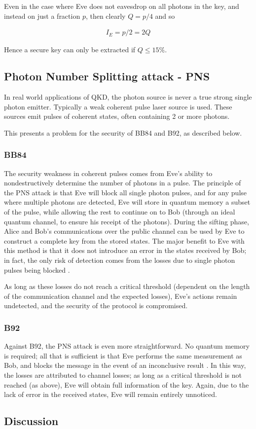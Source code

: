 \documentclass[paper=a4, fontsize=11pt]{scrartcl} %
\numberwithin{equation}{section} %
\numberwithin{figure}{section} %
\numberwithin{table}{section} %
\begin{document}
Even in the case where Eve does not eavesdrop on all photons in the key, and instead on just a fraction $p$,
then clearly $Q = p/4$ and so

\begin{align}
I_E	= p/2 = 2Q
\end{align}

Hence a secure key can only be extracted if $Q \leq 15\%$. \citep{qber15proof}

\subsection{Photon Number Splitting attack - PNS}
In real world applications of QKD, the photon source is never a true strong single photon emitter. Typically
a weak coherent pulse laser source is used. \citep{satellites}
These sources emit pulses of coherent states, often containing 2 or more photons.

This presents a problem for the security of BB84 and B92, as described below.

\subsubsection{BB84}
The security weakness in coherent pulses comes from Eve's ability to nondestructively determine the number of photons
in a pulse. The principle of the PNS attack is that Eve will block all single photon pulses, and for any pulse where
multiple photons are detected, Eve will store in quantum memory a subset of the pulse, while allowing the rest to continue
on to Bob (through an ideal quantum channel, to ensure his receipt of the photons). During the sifting
phase, Alice and Bob's communications over the public channel can be used by Eve to construct
a complete key from the stored states. The major benefit to Eve with this method is that it does not introduce an error in the
states received by Bob; in fact, the only risk of detection comes from the losses due to single photon pulses being blocked \citep{kronberg2009}.

As long as these losses do not reach a critical threshold (dependent on the length of the communication channel and the expected losses),
Eve's actions remain undetected, and the security of the protocol is compromised.


\subsubsection{B92}
Against B92, the PNS attack is even more straightforward. No quantum memory is required; all that is sufficient is that Eve performs
the same measurement as Bob, and blocks the message in the event of an inconclusive result \citep{kronberg2009}. In this way, the losses are attributed
to channel losses; as long as a critical threshold is not reached (as above), Eve will obtain full information of the key. Again, due to
the lack of error in the received states, Eve will remain entirely unnoticed.

\subsection{Discussion}







\end{document}
